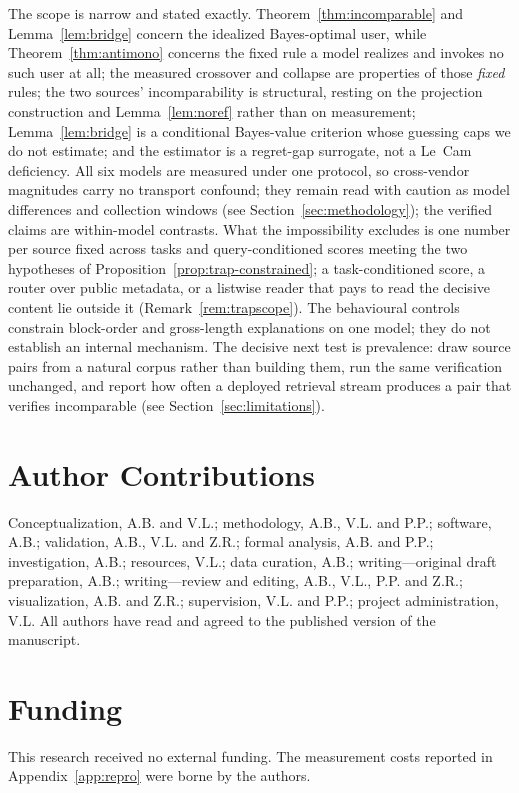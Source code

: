 \documentclass[11pt]{article}
\theoremstyle{plain}
\theoremstyle{definition}
\theoremstyle{remark}
\begin{document}
The scope is narrow and stated exactly. Theorem~\ref{thm:incomparable} and
Lemma~\ref{lem:bridge} concern the idealized Bayes-optimal user, while
Theorem~\ref{thm:antimono} concerns the fixed rule a model realizes and invokes no such user at
all; the measured crossover and collapse are properties of those \emph{fixed} rules; the two
sources'
incomparability is structural, resting on the projection construction and Lemma~\ref{lem:noref}
rather than on measurement; Lemma~\ref{lem:bridge} is a conditional Bayes-value criterion whose
guessing caps we do not estimate; and the estimator is a regret-gap surrogate, not a Le~Cam
deficiency. All six models are measured under one protocol, so cross-vendor magnitudes carry no
transport confound; they remain read with caution as model differences and collection windows
(see Section~\ref{sec:methodology}); the verified claims are within-model contrasts. What the impossibility
excludes is one number per source fixed across tasks and query-conditioned scores meeting the two
hypotheses of Proposition~\ref{prop:trap-constrained}; a task-conditioned score, a router over
public metadata, or a listwise reader that pays to read the decisive content lie outside it
(Remark~\ref{rem:trapscope}). The behavioural controls constrain block-order and gross-length
explanations on one model; they do not establish an internal mechanism. The decisive next test is
prevalence: draw source pairs from a
natural corpus rather than building them, run the same verification unchanged, and report how often
a deployed retrieval stream produces a pair that verifies incomparable (see Section~\ref{sec:limitations}).
\section*{Author Contributions}
Conceptualization, A.B. and V.L.; methodology, A.B., V.L. and P.P.; software, A.B.; validation,
A.B., V.L. and Z.R.; formal analysis, A.B. and P.P.; investigation, A.B.; resources, V.L.; data
curation, A.B.; writing---original draft preparation, A.B.; writing---review and editing, A.B.,
V.L., P.P. and Z.R.; visualization, A.B. and Z.R.; supervision, V.L. and P.P.; project
administration, V.L. All authors have read and agreed to the published version of the manuscript.

\section*{Funding}
This research received no external funding. The measurement costs reported in
Appendix~\ref{app:repro} were borne by the authors.
\end{document}

